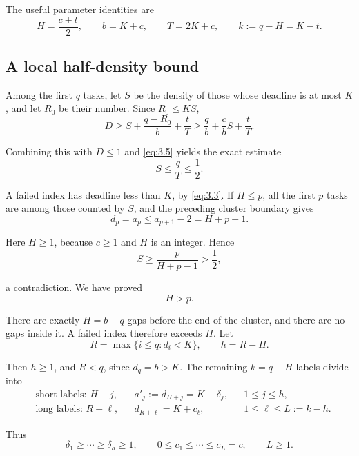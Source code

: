 \documentclass[11pt,a4paper]{article}
\begin{document}
The useful parameter identities are
\begin{equation}
H=\frac{c+t}{2},\qquad b=K+c,\qquad T=2K+c,
\qquad k:=q-H=K-t.
\tag{3.5}
\label{eq:3.5}
\end{equation}

\hypertarget{a-local-half-density-bound}{%
\subsection{A local half-density bound}\label{a-local-half-density-bound}}

Among the first \(q\) tasks, let \(S\) be the density of those whose deadline is at most \(K\), and let \(R_0\) be their number. Since \(R_0\le KS\),
\[
D\ge S+\frac{q-R_0}{b}+\frac tT
\ge\frac q b+\frac c b S+\frac tT.
\]

Combining this with \(D\le1\) and \eqref{eq:3.5} yields the exact estimate
\begin{equation}
\boxed{S\le\frac qT\le\frac12.}
\tag{3.6}
\label{eq:3.6}
\end{equation}

A failed index has deadline less than \(K\), by \eqref{eq:3.3}. If \(H\le p\), all the first \(p\) tasks are among those counted by \(S\), and the preceding cluster boundary gives
\[
d_p=a_p\le a_{p+1}-2=H+p-1.
\]

Here \(H\ge1\), because \(c\ge1\) and \(H\) is an integer. Hence
\[
S\ge\frac p{H+p-1}>\frac12,
\]

a contradiction. We have proved
\begin{equation}
H>p.
\tag{3.7}
\label{eq:3.7}
\end{equation}

There are exactly \(H=b-q\) gaps before the end of the cluster, and there are no gaps inside it. A failed index therefore exceeds \(H\). Let
\[
R=\max\{i\le q:d_i<K\},\qquad h=R-H.
\]

Then \(h\ge1\), and \(R<q\), since \(d_q=b>K\). The remaining \(k=q-H\) labels divide into
\begin{equation}
\begin{aligned}
&\text{short labels: } H+j,
&&a'_j:=d_{H+j}=K-\delta_j,
&&1\le j\le h,\\
&\text{long labels: } R+\ell,
&&d_{R+\ell}=K+c_\ell,
&&1\le\ell\le L:=k-h.
\end{aligned}
\tag{3.8}
\label{eq:3.8}
\end{equation}

Thus
\begin{equation}
\delta_1\ge\cdots\ge\delta_h\ge1,
\qquad
0\le c_1\le\cdots\le c_L=c,
\qquad L\ge1.
\tag{3.9}
\label{eq:3.9}
\end{equation}
\end{document}
